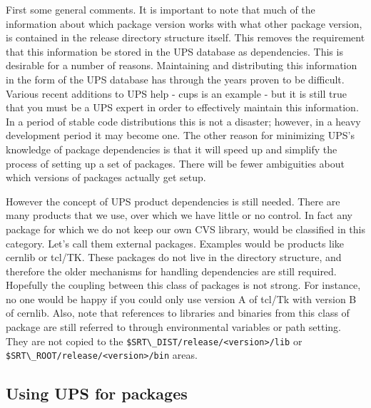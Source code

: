 First some general comments. It is important to note that much of the 
information about which package 
    version works with what other package version, is contained in the release 
directory structure itself. This
    removes the requirement that this information be stored in the UPS database
as dependencies. This is
    desirable for a number of reasons. Maintaining and distributing this 
information in the form of the UPS 
    database has through the years proven to be difficult. Various recent 
additions to UPS help - cups is an
    example - but it is still true that you must be a UPS expert in order to 
effectively maintain this information. In
    a period of stable code distributions this is not a disaster; however, in a 
heavy development period it may
    become one. The other reason for minimizing UPS's knowledge of package 
dependencies is that it will
    speed up and simplify the process of setting up a set of packages.
  There 
will be fewer ambiguities about
    which versions of packages actually get setup. 

    However the concept of UPS product dependencies is still needed. There are 
many products that we use, over
    which we have little or no control. In fact any 
package for which we do not keep
    our own CVS library, would be classified in this category. Let's call 
them external packages. Examples
    would be products like cernlib or tcl/TK. These packages do not live in the 
directory structure,
    and therefore the older mechanisms for handling dependencies are still required. 
Hopefully the coupling between
    this class of packages  is not strong. For instance, no one would be happy if
you could only use version A of
    tcl/Tk with version B of cernlib. Also, note that references to libraries and 
binaries from this class of package are still referred to through environmental 
variables or path setting. They are not copied to the
 \verb|$SRT\_DIST/release/<version>/lib| or \verb|$SRT\_ROOT/release/<version>/bin| areas. 

\subsection{Using UPS for packages}

